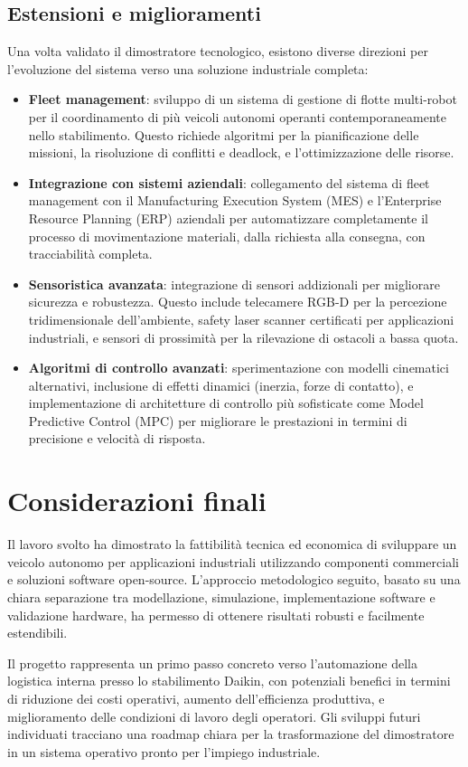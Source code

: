 \subsection{Estensioni e miglioramenti}

Una volta validato il dimostratore tecnologico, esistono diverse direzioni per l'evoluzione del sistema verso una soluzione industriale completa:

\begin{itemize}
    \item \textbf{Fleet management}: sviluppo di un sistema di gestione di flotte multi-robot per il coordinamento di più veicoli autonomi operanti contemporaneamente nello stabilimento. Questo richiede algoritmi per la pianificazione delle missioni, la risoluzione di conflitti e deadlock, e l'ottimizzazione delle risorse.

    \item \textbf{Integrazione con sistemi aziendali}: collegamento del sistema di fleet management con il Manufacturing Execution System (MES) e l'Enterprise Resource Planning (ERP) aziendali per automatizzare completamente il processo di movimentazione materiali, dalla richiesta alla consegna, con tracciabilità completa.

    \item \textbf{Sensoristica avanzata}: integrazione di sensori addizionali per migliorare sicurezza e robustezza. Questo include telecamere RGB-D per la percezione tridimensionale dell'ambiente, safety laser scanner certificati per applicazioni industriali, e sensori di prossimità per la rilevazione di ostacoli a bassa quota.

    \item \textbf{Algoritmi di controllo avanzati}: sperimentazione con modelli cinematici alternativi, inclusione di effetti dinamici (inerzia, forze di contatto), e implementazione di architetture di controllo più sofisticate come Model Predictive Control (MPC) per migliorare le prestazioni in termini di precisione e velocità di risposta.
\end{itemize}

\section{Considerazioni finali}

Il lavoro svolto ha dimostrato la fattibilità tecnica ed economica di sviluppare un veicolo autonomo per applicazioni industriali utilizzando componenti commerciali e soluzioni software open-source. L'approccio metodologico seguito, basato su una chiara separazione tra modellazione, simulazione, implementazione software e validazione hardware, ha permesso di ottenere risultati robusti e facilmente estendibili.

Il progetto rappresenta un primo passo concreto verso l'automazione della logistica interna presso lo stabilimento Daikin, con potenziali benefici in termini di riduzione dei costi operativi, aumento dell'efficienza produttiva, e miglioramento delle condizioni di lavoro degli operatori. Gli sviluppi futuri individuati tracciano una roadmap chiara per la trasformazione del dimostratore in un sistema operativo pronto per l'impiego industriale.
